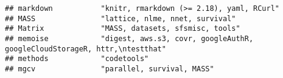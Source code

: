 \documentclass[
]{article}
\begin{document}
\begin{verbatim}
## markdown           "knitr, rmarkdown (>= 2.18), yaml, RCurl"                                                                                                                                                                                                                                                                                                                                                                                                                                         
## MASS               "lattice, nlme, nnet, survival"                                                                                                                                                                                                                                                                                                                                                                                                                                                   
## Matrix             "MASS, datasets, sfsmisc, tools"                                                                                                                                                                                                                                                                                                                                                                                                                                                  
## memoise            "digest, aws.s3, covr, googleAuthR, googleCloudStorageR, httr,\ntestthat"                                                                                                                                                                                                                                                                                                                                                                                                         
## methods            "codetools"                                                                                                                                                                                                                                                                                                                                                                                                                                                                       
## mgcv               "parallel, survival, MASS"                                                                                                                                                                                                                                                                                                                                                                                                                                                        

\end{verbatim}
\end{document}
